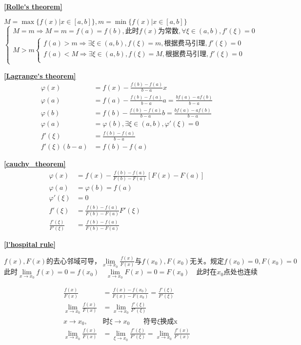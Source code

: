 \textbf{\large \ref{Rolle's theorem}}
\begin{center}
    $M=\max\{f(x)|x\in[a,b]\},m=\min\{f(x)|x\in[a,b]\}$
    $\begin{cases}
        M=m\Rightarrow M=m=f(a)=f(b),\mbox{此时}f(x)\mbox{为常数},\forall \xi \in(a,b),f'(\xi)=0\\
        M>m \begin{cases}
            f(a)>m \Rightarrow \exists \xi \in(a,b),f(\xi)=m,\mbox{根据费马引理},f'(\xi)=0\\
            f(a)<M \Rightarrow \exists \xi \in(a,b),f(\xi)=M,\mbox{根据费马引理},f'(\xi)=0\\
        \end{cases}
    \end{cases}$
\end{center}
\textbf{\large \ref{Lagrange's theorem}}
\begin{align*}
        \varphi(x)&=f(x)-\frac{f(b)-f(a)}{b-a}x\\
        \varphi(a)&=f(a)-\frac{f(b)-f(a)}{b-a}a=\frac{bf(a)-af(b)}{b-a}\\
        \varphi(b)&=f(b)-\frac{f(b)-f(a)}{b-a}b=\frac{bf(a)-af(b)}{b-a}\\
        \varphi(a)&=\varphi(b),\exists \xi\in(a,b),\varphi'(\xi)=0\\
        f'(\xi)&=\frac{f(b)-f(a)}{b-a}\\
        f'(\xi)(b-a)&=f(b)-f(a)
\end{align*}

\textbf{\large \ref{cauchy_theorem}}
\begin{align*}
        \varphi(x)&=f(x)-\frac{f(b)-f(a)}{F(b)-F(a)}\left[F(x)-F(a)\right] \\
        \varphi(a)&=\varphi(b)=f(a)\\
        \varphi'(\xi)&=0\\
        f'(\xi)&=\frac{f(b)-f(a)}{F(b)-F(a)}F'(\xi)\\
        \frac{f'(\xi)}{F'(\xi)}&=\frac{f(b)-f(a)}{F(b)-F(a)}
\end{align*}

\textbf{\large \ref{l'hospital rule}}
    \begin{center}
        $f(x),F(x)\mbox{的去心邻域可导，}\lim\limits_{x\to x_0}\frac{f(x)}{F(x)}\mbox{与}f(x_0),F(x_0)\mbox{无关。规定}f(x_0)=0,F(x_0)=0$\\
$\mbox{此时}\lim\limits_{x\to x_0}f(x)=0=f(x_0)\quad\lim\limits_{x\to x_0}F(x)=0=F(x_0)\quad\mbox{此时在$x_0$点处也连续}$\\
    \end{center}
    \begin{align*}
    \frac{f(x)}{F(x)}&=\frac{f(x)-f(x_0)}{F(x)-F(x_0)}=\frac{f'(\xi)}{F'(\xi)}\\
    \lim\limits_{x\to x_0}\frac{f(x)}{F(x)}&=\lim\limits_{x\to x_0}\frac{f'(\xi)}{F'(\xi)}\\
    x\rightarrow x_0,&\mbox{时}\xi\rightarrow x_0\qquad \mbox{符号$\xi$换成x}\\
    \lim\limits_{x\to x_0}\frac{f(x)}{F(x)}&=\lim\limits_{\xi\to x_0}\frac{f'(\xi)}{F'(\xi)}=\lim\limits_{x\to x_0}\frac{f'(x)}{F'(x)}
    \end{align*}

